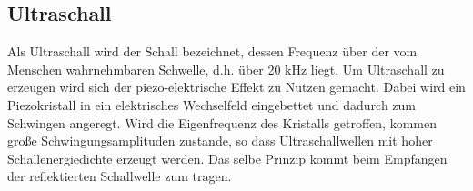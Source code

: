 \subsection{Ultraschall}
    Als Ultraschall wird der Schall bezeichnet, dessen Frequenz über der vom Menschen wahrnehmbaren 
    Schwelle, d.h. über 20 kHz liegt. Um Ultraschall zu erzeugen wird sich der piezo-elektrische
    Effekt zu Nutzen gemacht. Dabei wird ein Piezokristall in ein elektrisches Wechselfeld eingebettet
    und dadurch zum Schwingen angeregt. Wird die Eigenfrequenz des Kristalls getroffen, kommen
    große Schwingungsamplituden zustande, so dass Ultraschallwellen mit hoher Schallenergiedichte 
    erzeugt werden. Das selbe Prinzip kommt beim Empfangen der reflektierten Schallwelle zum 
    tragen.
